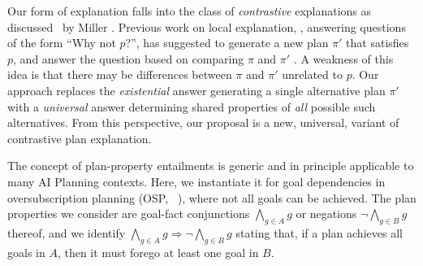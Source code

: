 Our form of explanation falls into the class of \emph{contrastive}
explanations as discussed \eg\ by Miller
. Previous work on local explanation, \ie,
answering questions of the form ``Why not $p$?'', has suggested to
generate a new plan $\pi'$ that satisfies $p$, and answer the question
based on comparing $\pi$ and $\pi'$
\cite{smith:aaai-12,fox:etal:ijcai-ws-17}. A weakness of this idea is
that there may be differences between $\pi$ and $\pi'$ unrelated to
$p$. Our approach replaces the \emph{existential} answer generating a
single alternative plan $\pi'$ with a \emph{universal} answer
determining shared properties of \emph{all} possible such
alternatives. From this perspective, our proposal is a new, universal,
variant of contrastive plan explanation.

%

%


The concept of plan-property entailments is generic and in principle
applicable to many AI Planning contexts. Here, we instantiate it for
goal dependencies in oversubscription planning (OSP,
\eg\ \cite{smith:icaps-04,domshlak:mirkis:jair-15}), where not all
goals can be achieved. The plan properties we consider are goal-fact
conjunctions $\bigwedge_{g \in A} g$ or negations $\neg \bigwedge_{g
  \in B} g$ thereof, and we identify 
$\bigwedge_{g \in A} g \Rightarrow \neg \bigwedge_{g \in B} g$ stating
that, if a plan achieves all goals in $A$, then it must forego at
least one goal in $B$.

